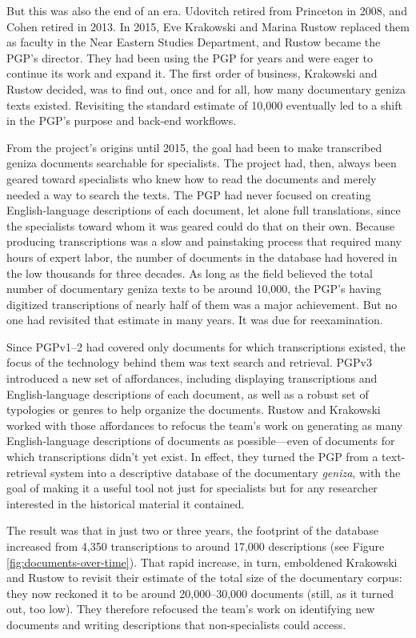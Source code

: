 \documentclass{article}
\begin{document}
But this was also the end of an era. Udovitch retired from Princeton in 2008, and Cohen retired in 2013. In 2015, Eve Krakowski and Marina Rustow replaced them as faculty in the Near Eastern Studies Department, and Rustow became the PGP’s director. They had been using the PGP for years and were eager to continue its work and expand it. The first order of business, Krakowski and Rustow decided, was to find out, once and for all, how many documentary geniza texts existed. Revisiting the standard estimate of 10,000 eventually led to a shift in the PGP’s purpose and back-end workflows. 

From the project’s origins until 2015, the goal had been to make transcribed geniza documents searchable for specialists. The project had, then, always been geared toward specialists who knew how to read the documents and merely needed a way to search the texts. The PGP had never focused on creating English-language descriptions of each document, let alone full translations, since the specialists toward whom it was geared could do that on their own. Because producing transcriptions was a slow and painstaking process that required many hours of expert labor, the number of documents in the database had hovered in the low thousands for three decades. As long as the field believed the total number of documentary geniza texts to be around 10,000, the PGP's having digitized transcriptions of nearly half of them was a major achievement. But no one had revisited that estimate in many years. It was due for reexamination. 

Since PGPv1–2 had covered only documents for which transcriptions existed, the focus of the technology behind them was text search and retrieval. PGPv3 introduced a new set of affordances, including displaying transcriptions and English-language descriptions of each document, as well as a robust set of typologies or genres to help organize the documents. Rustow and Krakowski worked with those affordances to refocus the team’s work on generating as many English-language descriptions of documents as possible—even of documents for which transcriptions didn’t yet exist. In effect, they turned the PGP from a text-retrieval system into a descriptive database of the documentary \textit{geniza}, with the goal of making it a useful tool not just for specialists but for any researcher interested in the historical material it contained. 

The result was that in just two or three years, the footprint of the database increased from 4,350 transcriptions to around 17,000 descriptions (see Figure \ref{fig:documents-over-time}). That rapid increase, in turn, emboldened Krakowski and Rustow to revisit their estimate of the total size of the documentary corpus: they now reckoned it to be around 20,000–30,000 documents (still, as it turned out, too low). They therefore refocused the team’s work on identifying new documents and writing descriptions that non-specialists could access.
\end{document}
